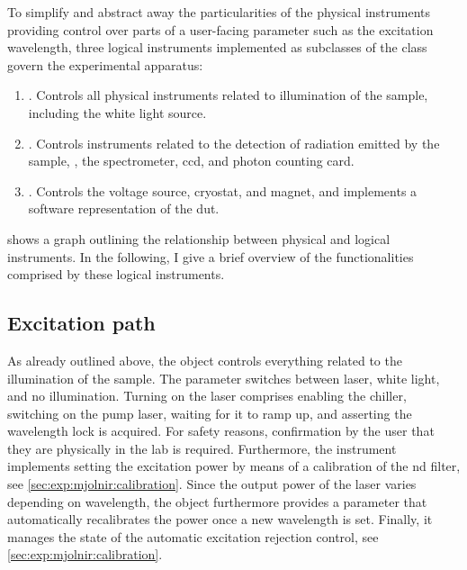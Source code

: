 To simplify and abstract away the particularities of the physical instruments providing control over parts of a user-facing parameter such as the excitation wavelength,
three logical instruments implemented as subclasses of the \qcodes {} class govern the experimental apparatus:
\begin{enumerate}\label{enm:logical_instruments}
    \item \label{itm:logical_instruments:exc}
        .
        Controls all physical instruments related to illumination of the sample, including the white light source.
    \item \label{itm:logical_instruments:det}
        .
        Controls instruments related to the detection of radiation emitted by the sample, \ie, the spectrometer, \gls{ccd}, and photon counting card.
    \item \label{itm:logical_instruments:sam}
        .
        Controls the \qdac voltage source, cryostat, and magnet, and implements a software representation of the \gls{dut}.
\end{enumerate}
 shows a graph outlining the relationship between physical and logical instruments.
In the following, I give a brief overview of the functionalities comprised by these logical instruments.

\subsection{Excitation path}\label{subsec:exp:mjolnir:logical_instruments:exc}
As already outlined above, the  object controls everything related to the illumination of the sample.
The  parameter switches between laser, white light, and no illumination.
Turning on the laser comprises enabling the chiller, switching on the pump laser, waiting for it to ramp up, and asserting the wavelength lock is acquired.
For safety reasons, confirmation by the user that they are physically in the lab is required.
Furthermore, the  instrument implements setting the excitation power by means of a calibration of the \gls{nd} filter, see \cref{sec:exp:mjolnir:calibration}.
Since the output power of the laser varies depending on wavelength, the object furthermore provides a  parameter that automatically recalibrates the power once a new wavelength is set.
Finally, it manages the state of the automatic excitation rejection control, see \cref{sec:exp:mjolnir:calibration}.

